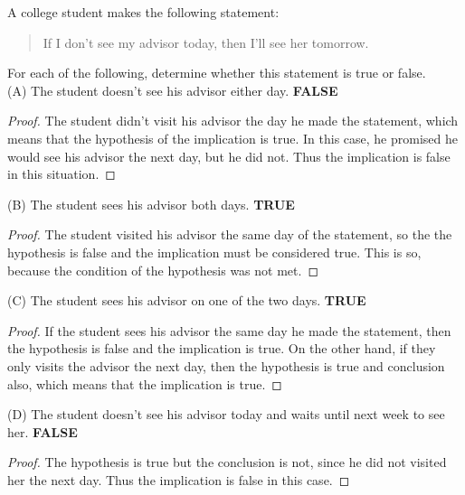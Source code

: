 \documentclass[12pt]{article}
\newenvironment{problem}[2][Problem]{\begin{trivlist}
		\item[\hskip \labelsep {\bfseries #1}\hskip \labelsep {\bfseries #2.}]}{\end{trivlist}}
\begin{document}
\begin{problem}{26}
	A college student makes the following statement:
	\begin{quote}
		If I don't see my advisor today, then I'll see her tomorrow.
	\end{quote}
	For each of the following, determine whether this statement is true or false.\\
	
	(A) The student doesn't see his advisor either day. \textbf{ FALSE}
	\begin{proof}
		The student didn't visit his advisor the day he made the statement, which means that the hypothesis of the implication is true. In this case, he promised he would see his advisor the next day, but he did not. Thus the implication is false in this situation.
	\end{proof}
	(B) The student sees his advisor both days. \textbf{ TRUE}
	\begin{proof}
		The student visited his advisor the same day of the statement, so the the hypothesis is false and the implication must be considered true. This is so, because the condition of the hypothesis was not met.
	\end{proof}
	(C) The student sees his advisor on one of the two days. \textbf{ TRUE}
	\begin{proof}
		If the student sees his advisor the same day he made the statement, then the hypothesis is false and the implication is true. On the other hand, if they only visits the advisor the next day, then the hypothesis is true and conclusion also, which means that the implication is true.
	\end{proof}
	(D) The student doesn't see his advisor today and waits until next week to see her. \textbf{ FALSE}
	\begin{proof}
		The hypothesis is true but the conclusion is not, since he did not visited her the next day. Thus the implication is false in this case.
	\end{proof}
\end{problem}
\end{document}
